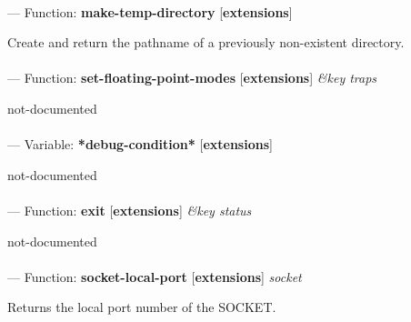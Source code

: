 \paragraph{}
\label{EXTENSIONS:MAKE-TEMP-DIRECTORY}
--- Function: \textbf{make-temp-directory} [\textbf{extensions}] \textit{}

\begin{adjustwidth}{5em}{5em}
Create and return the pathname of a previously non-existent directory.
\end{adjustwidth}

\paragraph{}
\label{EXTENSIONS:SET-FLOATING-POINT-MODES}
--- Function: \textbf{set-floating-point-modes} [\textbf{extensions}] \textit{\&key traps}

\begin{adjustwidth}{5em}{5em}
not-documented
\end{adjustwidth}

\paragraph{}
\label{EXTENSIONS:*DEBUG-CONDITION*}
--- Variable: \textbf{*debug-condition*} [\textbf{extensions}] \textit{}

\begin{adjustwidth}{5em}{5em}
not-documented
\end{adjustwidth}

\paragraph{}
\label{EXTENSIONS:EXIT}
--- Function: \textbf{exit} [\textbf{extensions}] \textit{\&key status}

\begin{adjustwidth}{5em}{5em}
not-documented
\end{adjustwidth}

\paragraph{}
\label{EXTENSIONS:SOCKET-LOCAL-PORT}
--- Function: \textbf{socket-local-port} [\textbf{extensions}] \textit{socket}

\begin{adjustwidth}{5em}{5em}
Returns the local port number of the SOCKET.
\end{adjustwidth}

